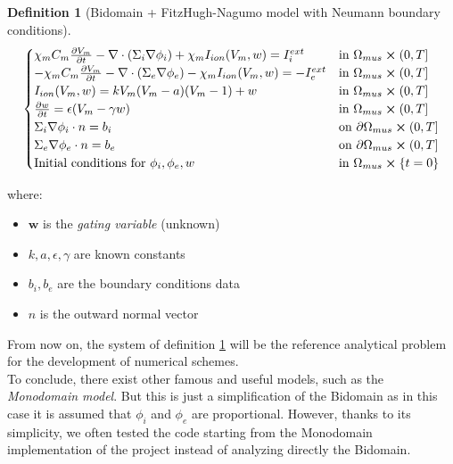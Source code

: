 \documentclass[a4paper,11pt]{article}
\newtheorem{definition}{Definition}
\begin{document}
    \begin{definition}[Bidomain + FitzHugh-Nagumo model with Neumann boundary conditions]\label{def1}
    	\begin{equation*}
    	\begin{cases}
    	\chi_m C_m\pdv{V_m}{t} - \nabla \cdot (\Sigma_i \nabla \phi_i) + \chi_m I_{ion}(V_m,w) = I_i^{ext}    & \text{in } \Omega_{mus} \cross (0,T]
    	\\
    	-\chi_m C_m\pdv{V_m}{t} - \nabla \cdot (\Sigma_e \nabla \phi_e) - \chi_m I_{ion}(V_m,w) = -I_e^{ext}    & \text{in } \Omega_{mus} \cross (0,T]
    	\\
    	I_{ion}(V_m,w)=kV_m(V_m-a)(V_m-1)+w & \text{in } \Omega_{mus} \cross (0,T]
    	\\
    	\pdv{w}{t} = \epsilon(V_m-\gamma w)  & \text{in } \Omega_{mus} \cross (0,T]
    	\\
    	\Sigma_i\nabla \phi_i \cdot n = b_i   & \text{on } \partial \Omega_{mus} \cross (0,T]
    	\\
    	\Sigma_e\nabla \phi_e \cdot n = b_e   & \text{on } \partial \Omega_{mus} \cross (0,T]
    	\\
    	\text{Initial conditions for } \phi_i,\phi_e, w & \text{in } \Omega_{mus}\cross\{t=0\}
    	\end{cases}
    	\end{equation*}
    \end{definition}
    \vspace{3mm}
    where:
    \begin{itemize}[label=\textendash]
    	\item $\bm{w}$ is the \emph{gating variable} (unknown)
    	\item $k,a,\epsilon,\gamma$ are known constants
    	\item $b_i,b_e$ are the boundary conditions data
    	\item $n$ is the outward normal vector
    \end{itemize}

    \vspace{4mm}
    \noindent From now on, the system of definition \ref{def1} will be the reference analytical problem for the development of numerical schemes.\\
    To conclude, there exist other famous and useful models, such as the \emph{Monodomain model}. But this is just a simplification of the Bidomain as in this case it is assumed that $\phi_i$ and $\phi_e$ are proportional. However, thanks to its simplicity, we often tested the code starting from the Monodomain implementation of the project \cite{andreotti} instead of analyzing directly the Bidomain.
\end{document}
